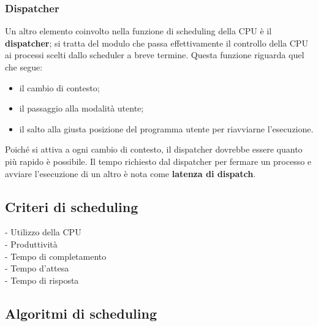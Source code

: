 \documentclass[11pt,a4paper]{article}
\begin{document}
\subsubsection{Dispatcher}
Un altro elemento coinvolto nella funzione di scheduling della CPU è il \textbf{dispatcher}; si tratta
del modulo che passa effettivamente il controllo della CPU ai processi scelti dallo scheduler
a breve termine. Questa funzione riguarda quel che segue:
\begin{itemize}[noitemsep, leftmargin=*]
  \item il cambio di contesto;
  \item il passaggio alla modalità utente;
  \item il salto alla giusta posizione del programma utente per riavviarne l'esecuzione.
\end{itemize}
%
Poiché si attiva a ogni cambio di contesto, il dispatcher dovrebbe essere quanto più rapido è
possibile. Il tempo richiesto dal dispatcher per fermare un processo e avviare l'esecuzione di
un altro è nota come \textbf{latenza di dispatch}.

\subsection{Criteri di scheduling}
- Utilizzo della CPU\\
- Produttività\\
- Tempo di completamento\\
- Tempo d'attesa\\
- Tempo di risposta\\

\subsection{Algoritmi di scheduling}
\end{document}
